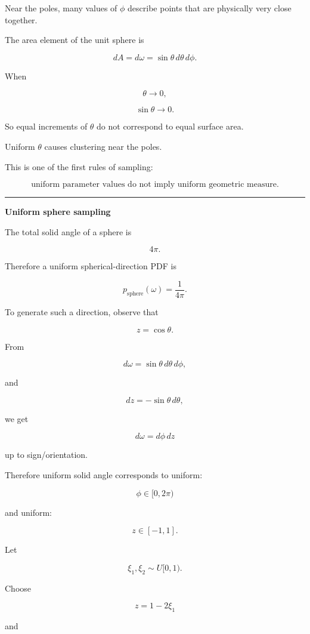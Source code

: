 Near the poles, many values of \(\phi\) describe points that are physically very close together.

The area element of the unit sphere is

\[
dA=d\omega
=
\sin\theta\,d\theta\,d\phi.
\]

When

\[
\theta\rightarrow0,
\]

\[
\sin\theta\rightarrow0.
\]

So equal increments of \(\theta\) do not correspond to equal surface area.

Uniform \(\theta\) causes clustering near the poles.

This is one of the first rules of sampling:

\[
\boxed{
\text{uniform parameter values do not imply uniform geometric measure.}
}
\]

\begin{center}\rule{0.5\linewidth}{0.5pt}\end{center}

\textbf{Uniform sphere sampling}

The total solid angle of a sphere is

\[
4\pi.
\]

Therefore a uniform spherical-direction PDF is

\[
\boxed{
p_{\text{sphere}}(\omega)
=
\frac{1}{4\pi}.
}
\]

To generate such a direction, observe that

\[
z=\cos\theta.
\]

From

\[
d\omega
=
\sin\theta\,d\theta\,d\phi,
\]

and

\[
dz=-\sin\theta\,d\theta,
\]

we get

\[
d\omega=d\phi\,dz
\]

up to sign/orientation.

Therefore uniform solid angle corresponds to uniform:

\[
\phi\in[0,2\pi)
\]

and uniform:

\[
z\in[-1,1].
\]

Let

\[
\xi_1,\xi_2\sim U[0,1).
\]

Choose

\[
\boxed{
z=1-2\xi_1
}
\]

and

